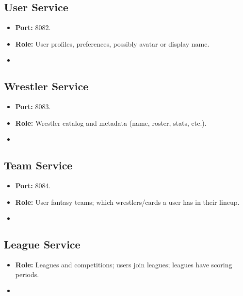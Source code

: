 \documentclass[11pt,a4paper]{article}
\begin{document}
\subsection{User Service}
\begin{itemize}
\item \textbf{Port:} 8082.
\item \textbf{Role:} User profiles, preferences, possibly avatar or display name.
\item %
\end{itemize}

\subsection{Wrestler Service}
\begin{itemize}
\item \textbf{Port:} 8083.
\item \textbf{Role:} Wrestler catalog and metadata (name, roster, stats, etc.).
\item %
\end{itemize}

\subsection{Team Service}
\begin{itemize}
\item \textbf{Port:} 8084.
\item \textbf{Role:} User fantasy teams; which wrestlers/cards a user has in their lineup.
\item %
\end{itemize}

\subsection{League Service}
\begin{itemize}
\item \textbf{Role:} Leagues and competitions; users join leagues; leagues have scoring periods.
\item %
\end{itemize}
\end{document}
